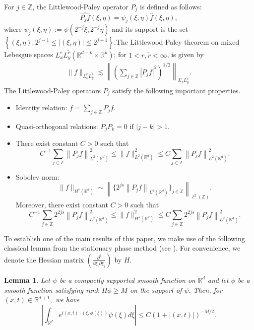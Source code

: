\documentclass[a4paper,11pt, reqno]{amsart}
\newtheorem{lem}[theorem]{Lemma}
\theoremstyle{definition}
\theoremstyle{remark}
\numberwithin{equation}{section}
\begin{document}
 	For $j \in \mathbb{Z}$, the Littlewood-Paley operator $P_j$ is defined as follows:
	\begin{equation} \label{lpope}
	    \widehat{P_j f}(\xi, \eta)=\psi_j(\xi, \eta) \hat{f}(\xi, \eta),
	\end{equation}
	where $\psi_j(\xi, \eta):=\psi\left(2^{-j} \xi, 2^{-j} \eta\right)$  and its support is the set  $\left\{(\xi, \eta): 2^{j-1} \leq|(\xi, \eta)| \leq 2^{j+1}\right\}$.The Littlewood-Paley theorem  on mixed Lebesgue spaces $L_x^r L_y^{\widetilde{r}}\left(\mathbb{R}^{d-k} \times \mathbb{R}^k\right)$; for $1<r, \widetilde{r}<\infty$,
	is given by 	\begin{align}\label{norm}
	\|f\|_{L_x^r L_y^{\tilde{r}}} \lesssim\left\| \left(\sum_{j \in \mathbb{Z}} \left|P_j f\right|^2\right)^{1 / 2}\right\|_{L_x^r L_y^{\tilde{r}}} .
	\end{align}
	The    Littlewood-Paley operators    $P_j$ satisfy the following important properties. 
	\begin{itemize}
		\item Identity relation: $f= \displaystyle \sum_{j \in \mathbb{Z}} P_j f.$
		\item  Quasi-orthogonal relations: $P_jP_k=0$ if $|j-k|>1.$
		\item There exist constant $C>0$ such that $$C^{-1} \sum_{j \in \mathbb{Z}}\left\| P_j f\right\|_{L^2\left(\mathbb{R}^{d}\right)}^2 \leq\|f\|_{L^2\left(\mathbb{R}^{d}\right)}^2 \leq C \sum_{j \in \mathbb{Z}}\left\|P_j f\right\|_{L^2\left(\mathbb{R}^{d}\right)}^2.$$
		\item  Sobolev norm: $$\|f\|_{H^s\left(\mathbb{R}^{d}\right)}\sim   \left\|\{2^{js}\left\| P_j f\right\|_{L^2\left(\mathbb{R}^{d}\right)}\}_{j\in\mathbb{Z}}\right \|_{\ell^2(\mathbb{Z})} .$$
		Moreover, there exist constant $C>0$ such that
		$$C^{-1} \sum_{j \in \mathbb{Z}} 2^{2js}\left\| P_j f\right\|_{L^2\left(\mathbb{R}^{d}\right)}^2 \leq\|f\|_{H^s\left(\mathbb{R}^{d}\right)}^2 \leq C \sum_{j \in \mathbb{Z}}2^{2js}\left\|P_j f\right\|_{L^2\left(\mathbb{R}^{d}\right)}^2.$$
	\end{itemize}
	To establish one of the main results of this paper, we make use of the following classical lemma from the stationary phase method (see \cite[VIII, Section 5, B]{S2}). For convenience, we denote the Hessian matrix  $\left(\frac{\partial^2}{\partial \xi_i \partial \xi_j}\right)$ by $H$.
	\begin{lem}\label{eq8}
		 Let $\psi$ be a compactly supported smooth function on $\mathbb{R}^{d}$ and let $\phi$ be  a smooth function satisfying rank $H \phi \geq M$ on the support of $\psi$. Then, for $(x, t) \in \mathbb{R}^{d+1},$ we have 
		$$
		\left|\int_{\mathbb{R}^d} e^{i(x, t) \cdot(\xi, \phi(\xi))} \psi(\xi) d \xi\right| \leq C(1+|(x, t)|)^{-M/ 2} .
		$$
		\end{lem}
        
\end{document}
